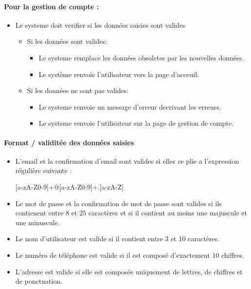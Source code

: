 \documentclass{article}
\begin{document}
\paragraph{Pour la gestion de compte : }
\begin{itemize}
\item Le systeme doit verifier si les données saisies sont valides
	\begin{itemize}
	\item Si les données sont valides:
		\begin{itemize}
		\item Le systeme remplace les données obsoletes par
                  les nouvelles données.
                \item Le système renvoie l'utilisateur vers la page d'acceuil.
		\end{itemize}
		\item Si les données ne sont pas valides:
		\begin{itemize}
		\item Le systeme renvoie un message d'erreur decrivant
                  les erreurs.
                \item Le systeme renvoie l'utilisateur sur la page de
                  gestion de compte.
		\end{itemize}
	\end{itemize}
\end{itemize}

\paragraph{Format / validitée des données saisies}
\begin{itemize}
\item L'email  et la confirmation d'email sont valides si elles ce plie a l'expression régulière
  suivante :

[a-zA-Z0-9]+@[a-zA-Z0-9]+.[a-zA-Z]

\item Le mot de passe et la confirmation de mot de passe sont valides si ils contienent entre 8 et 25
  caractères et si il contient au moins une majuscule et une minuscule.

\item Le nom d'utilisateur est valide si il contient entre 3 et 10
  caractères.

\item Le numéro de téléphone est valide si il est composé d'exactement
  10 chiffres.

\item L'adresse est valide si elle est composée uniquement de lettres,
  de chiffres et de ponctuation.
\end{itemize}
\end{document}
